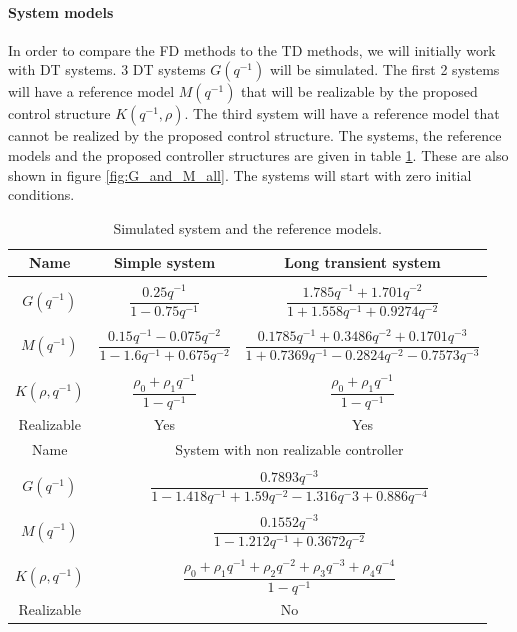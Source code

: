 \paragraph{System models}
In order to compare the FD methods to the TD methods, we will initially work with DT systems. 3 DT systems $G(q^{-1})$ will be simulated. The first 2 systems will have a reference model $M(q^{-1})$ that will be realizable by the proposed control structure $K(q^{-1},\rho)$. The third system will have a reference model that cannot be realized by the proposed control structure. The systems, the reference models and the proposed controller structures are given in table \ref{tab:simulated_systems}. These are also shown in figure \ref{fig:G_and_M_all}. The systems will start with zero initial conditions.

\begin{table}[H]
\centering
\begin{tabular}{|ccc|}
\hline
Name & Simple system & Long transient system\\
\hline
&&\\[-2.5ex]
$G(q^{-1})$ & $\dfrac{0.25 q^{-1}}{1 - 0.75 q^{-1}}$ & $\dfrac{1.785 q^{-1} + 1.701 q^{-2}}{1 + 1.558 q^{-1} + 0.9274 q^{-2}}$ \\
\hline
&&\\[-2.5ex]
$M(q^{-1})$ & $\dfrac{0.15 q^{-1} - 0.075 q^{-2}}{1 - 1.6 q^{-1} + 0.675 q^{-2}}$ & $\dfrac{0.1785 q^{-1} + 0.3486 q^{-2} + 0.1701 q^{-3}}{1 + 0.7369 q^{-1} - 0.2824 q^{-2} - 0.7573 q^{-3}}$ \\
\hline
&&\\[-2.5ex]
$K(\rho,q^{-1})$ & $\dfrac{\rho_0 + \rho_1 q^{-1}}{1-q^{-1}}$ & $\dfrac{\rho_0 + \rho_1 q^{-1}}{1-q^{-1}}$ \\
\hline
Realizable & Yes & Yes \\
\hline
\hline
Name & \multicolumn{2}{c|}{System with non realizable controller} \\
\hline
&&\\[-2.5ex]
$G(q^{-1})$ & \multicolumn{2}{c|}{$\dfrac{0.7893 q^{-3}}{1 - 1.418 q^{-1} + 1.59 q^{-2} - 1.316 q{^-3} + 0.886 q^{-4}}$}\\
\hline
&&\\[-2.5ex]
$M(q^{-1})$ & \multicolumn{2}{c|}{$\dfrac{0.1552 q^{-3}}{1 - 1.212 q^{-1} + 0.3672 q^{-2}}$} \\
\hline
&&\\[-2.5ex]
$K(\rho,q^{-1})$ & \multicolumn{2}{c|}{$\dfrac{\rho_0 + \rho_1 q^{-1} + \rho_2 q^{-2} + \rho_3 q^{-3} + \rho_4 q^{-4}}{1-q^{-1}}$} \\
\hline
Realizable & \multicolumn{2}{c|}{No} \\
\hline
\end{tabular}
\caption{Simulated system and the reference models.}
\label{tab:simulated_systems}
\end{table}


